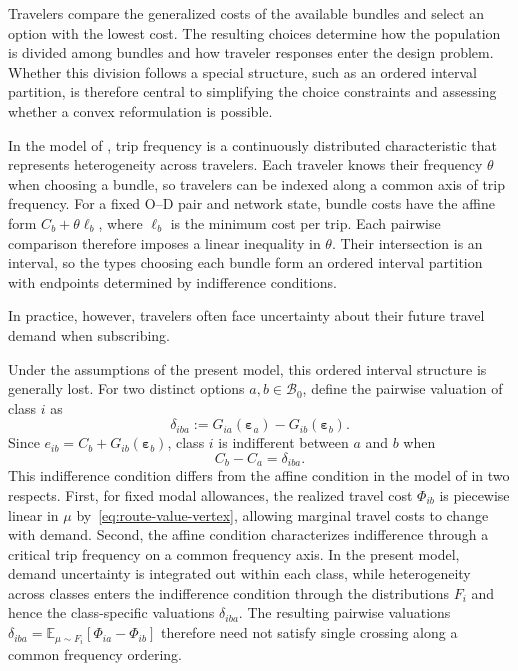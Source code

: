 \documentclass{article}
\begin{document}
Travelers compare the generalized costs of the available bundles and
select an option with the lowest cost. The resulting choices determine
how the population is divided among bundles and how traveler responses enter
the design problem. Whether this division follows a
special structure, such as an ordered interval partition, is therefore
central to simplifying the choice constraints and assessing whether a
convex reformulation is possible.

In the model of \citet{LiEtAlMaaSContinuous}, trip frequency is a
continuously distributed characteristic that represents heterogeneity
across travelers. Each traveler knows their frequency $\theta$ when
choosing a bundle, so travelers can be indexed along a common
axis of trip frequency. For a fixed O--D pair and network state, bundle
costs have the affine form $C_b+\theta\ell_b$,
where $\ell_b$ is the minimum cost per trip. Each pairwise comparison
therefore imposes a linear inequality in $\theta$. Their intersection
is an interval, so the types choosing each bundle form an ordered
interval partition with endpoints determined by indifference conditions.

In practice, however, travelers often face uncertainty about their
future travel demand when subscribing.

Under the assumptions of the present model, this ordered interval structure
is generally lost.
For two distinct options $a,b\in\mathcal B_0$, define the pairwise
valuation of class $i$ as
\begin{equation}
    \delta_{iba}
    :=
    G_{ia}(\bm\varepsilon_a)
    -
    G_{ib}(\bm\varepsilon_b).
    \label{eq:pairwise-bundle-valuation}
\end{equation}
Since $e_{ib}=C_b+G_{ib}(\bm\varepsilon_b)$, class $i$ is indifferent
between $a$ and $b$ when
\begin{equation}
    C_b-C_a
    =
    \delta_{iba}.
    \label{eq:pairwise-indifference}
\end{equation}
This indifference condition differs from the affine condition in the model of
\citet{LiEtAlMaaSContinuous} in two respects.
First, for fixed modal allowances, the realized travel cost $\Phi_{ib}$
is piecewise linear in $\mu$ by~\eqref{eq:route-value-vertex}, allowing
marginal travel costs to change with demand.
Second, the affine condition characterizes indifference through a
critical trip frequency on a common frequency axis. In the present
model, demand uncertainty is integrated out within each class, while
heterogeneity across classes enters the indifference condition through
the distributions $F_i$ and hence the class-specific valuations
$\delta_{iba}$.
The resulting pairwise valuations
$\delta_{iba}=\mathbb E_{\mu\sim F_i}[\Phi_{ia}-\Phi_{ib}]$
therefore need not satisfy single crossing along a common frequency
ordering.
\end{document}
